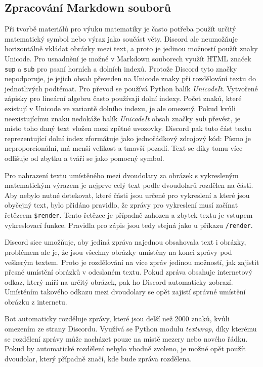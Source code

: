 \documentclass[FM]{tulthesis}
\begin{document}
	
	\subsection{Zpracování Markdown souborů}
	
	Při tvorbě materiálů pro výuku matematiky je často potřeba použít určitý matematický symbol nebo výraz jako součást věty. Discord ale neumožňuje horizontálně vkládat obrázky mezi text, a proto je jedinou možností použít znaky Unicode. Pro usnadnění je možné v Markdown souborech využít HTML značek \verb*|sup| a \verb*|sub| pro psaní horních a dolních indexů. Protože Discord tyto značky nepodporuje, je jejich obsah převeden na Unicode znaky při rozdělování textu do jednotlivých podtémat. Pro převod se používá Python balík \textit{UnicodeIt}. Vytvořené zápisky pro lineární algebru často používají dolní indexy. Počet znaků, které existují v Unicode ve variantě dolního indexu, je ale omezený. Pokud kvůli neexistujícímu znaku nedokáže balík \textit{UnicodeIt} obsah značky \verb*|sub| převést, je místo toho daný text vložen mezi zpětné uvozovky. Discord pak tuto část textu reprezentující dolní index zformátuje jako jednořádkový zdrojový kód: Písmo je neproporcionální, má menší velikost a tmavší pozadí. Text se díky tomu více odlišuje od zbytku a tváří se jako pomocný symbol.
	
	Pro nahrazení textu umístěného mezi dvoudolary za obrázek s vykresleným matematickým výrazem je nejprve celý text podle dvoudolarů rozdělen na části. Aby nebylo nutné detekovat, které části jsou určené pro vykreslení a které jsou obyčejný text, bylo přidáno pravidlo, že zprávy pro vykreslení musí začínat řetězcem \verb*|$render|. Tento řetězec je případně zahozen a zbytek textu je vstupem vykreslovací funkce. Pravidla pro zápis jsou tedy stejná jako u příkazu \verb*|/render|.
	
	Discord sice umožňuje, aby jediná zpráva najednou obsahovala text i obrázky, problémem ale je, že jsou všechny obrázky umístěny na konci zprávy pod veškerým textem. Proto je rozdělování na více zpráv jedinou možností, jak zajistit přesné umístění obrázků v odeslaném textu. Pokud zpráva obsahuje internetový odkaz, který míří na určitý obrázek, pak ho Discord automaticky zobrazí. Umístěním takového odkazu mezi dvoudolary se opět zajistí správné umístění obrázku z internetu.
	
	Bot automaticky rozděluje zprávy, které jsou delší než 2000 znaků, kvůli omezením ze strany Discordu. Využívá se Python modulu \textit{textwrap}, díky kterému se rozdělení zprávy může nacházet pouze na místě mezery nebo nového řádku. Pokud by automatické rozdělení nebylo vhodně zvoleno, je možné opět použít dvoudolar, který případně značí, kde bude zpráva rozdělena.
	
\end{document}
